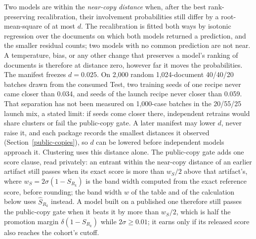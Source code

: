 Two models are within the \emph{near-copy distance} when, after the best
rank-preserving recalibration, their involvement probabilities still differ by
a root-mean-square of at most \(d\). The recalibration is fitted both ways by isotonic
regression over the documents on which both models returned a prediction, and
the smaller residual counts; two models with no common prediction are not near.
A temperature, bias, or any other change that preserves a model's ranking of
documents is therefore at distance zero, however far it moves the
probabilities. The manifest freezes \(d=0.025\). On 2,000 random 1,024-document
40/40/20 batches drawn from the consumed Test, two training seeds of one recipe
never came closer than 0.034, and seeds of the launch recipe never closer than
0.059. That separation has not been measured on 1,000-case batches in the
20/55/25 launch mix, a stated limit: if seeds come closer there, independent
retrains would share clusters or fail the public-copy gate. A later manifest
may lower \(d\), never raise it, and each package records the smallest
distances it observed (Section~\ref{public-copies}), so \(d\) can be lowered
before independent models approach it.
Clustering uses this distance alone. The public-copy gate adds one score clause,
read privately: an entrant within the near-copy distance of an earlier artifact
still passes when its exact score is more than \(w_S/2\) above that artifact's,
where \(w_S=2\sigma(1-S_{R_k})\) is the band width computed from the exact
reference score, before rounding; the band width \(w\) of the table and of the
calculation below uses \(\hat S_{R_k}\) instead. A model built on a published
one therefore still passes the public-copy gate when it beats it by more than
\(w_S/2\), which is half the promotion margin \(\delta(1-S_{R_k})\) while
\(2\sigma\geq0.01\); it earns only if its released score also reaches the
cohort's cutoff.

